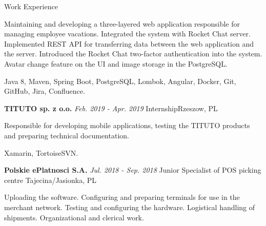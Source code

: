 \documentclass{resume}
\begin{document}
\begin{rSection}{Work Experience}
\begin{rSubsection}
    \item[] {Maintaining and developing a three-layered web application responsible for managing employee vacations.
    Integrated the system with Rocket Chat server. Implemented REST API for transferring data between the web
    application and the server. Introduced the Rocket Chat two-factor authentication into the system.
    Avatar change feature on the UI and image storage in the PostgreSQL.}
    \item[] {Java 8, Maven, Spring Boot, PostgreSQL, Lombok, Angular, Docker, Git, GitHub, Jira, Confluence.}

\end{rSubsection}

\begin{rSubsection}
    {\bf TITUTO sp. z o.o.}
    {\em Feb. 2019 - Apr. 2019}
    {\normalfont Internship}{Rzeszow, PL}

    \item[] {Responsible for developing mobile applications, testing the TITUTO products and preparing technical documentation.}
    \item[] {Xamarin, TortoiseSVN.}

\end{rSubsection}

\begin{rSubsection}
    {\bf Polskie ePlatnosci S.A.}
    {\em Jul. 2018 - Sep. 2018}
    {\normalfont Junior Specialist of POS picking centre}
    {Tajecina/Jasionka, PL}

    \item[] {Uploading the software. Configuring and preparing terminals for use in the merchant
    network. Testing and configuring the hardware. Logistical handling of shipments. Organizational and clerical work.}

\end{rSubsection}

\end{rSection}
\end{document}

